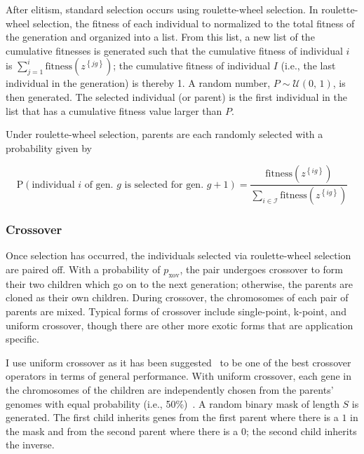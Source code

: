 \documentclass[12pt,dvipsnames]{report}
\begin{document}
After elitism, standard selection occurs using roulette-wheel selection.  In roulette-wheel selection, the fitness of each individual to normalized to the total fitness of the generation and organized into a list.  From this list, a new list of the cumulative fitnesses is generated such that the cumulative fitness of individual $i$ is $\sum_{j = 1}^i \text{fitness} \left( z^{\left\{ jg \right\}} \right)$; the cumulative fitness of individual $I$ (i.e., the last individual in the generation) is thereby 1.  A random number, $P \sim \mathcal{U} \left( 0,\, 1 \right)$, is then generated.  The selected individual (or parent) is the first individual in the list that has a cumulative fitness value larger than $P$.

Under roulette-wheel selection, parents are each randomly selected with a probability given by

\begin{equation}
\text{P}\left( \text{individual $i$ of gen. $g$ is selected for gen. $g+1$} \right) = \frac{\text{fitness}\left( z^{\left\{ ig \right\}} \right)}{\sum_{i \in \mathcal{I}} \text{fitness}\left( z^{\left\{ ig \right\}} \right)}
\end{equation}

\subsubsection{Crossover}

Once selection has occurred, the individuals selected via roulette-wheel selection are paired off.  With a probability of $p_{\text{xov}}$, the pair undergoes crossover to form their two children which go on to the next generation; otherwise, the parents are cloned as their own children.  During crossover, the chromosomes of each pair of parents are mixed.  Typical forms of crossover include single-point, k-point, and uniform crossover, though there are other more exotic forms that are application specific.

I use uniform crossover as it has been suggested~\cite{Picek:2011:ECO:2184629.2184665} to be one of the best crossover operators in terms of general performance.  With uniform crossover, each gene in the chromosomes of the children are independently chosen from the parents' genomes with equal probability (i.e., 50\%)~\cite{Syswerda:1989:UCG:645512.657265}.  A random binary mask of length $S$ is generated.  The first child inherits genes from the first parent where there is a $1$ in the mask and from the second parent where there is a $0$; the second child inherits the inverse.
\end{document}
